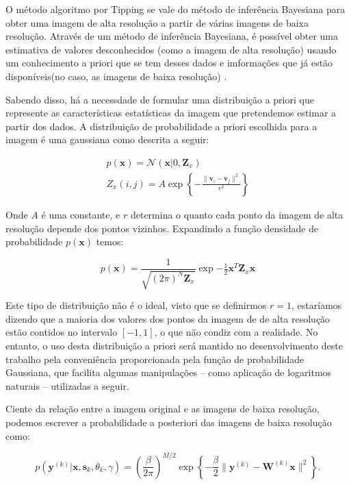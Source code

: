 \documentclass[12pt,openright,oneside,a4paper,english,brazil]{abntex2}
\begin{document}
O método algoritmo por Tipping se vale do método de inferência Bayesiana para obter uma imagem de alta resolução a partir de várias imagens de baixa resolução.
Através de um método de inferência Bayesiana, é possível obter uma estimativa de valores desconhecidos (como a imagem de alta resolução) usando um conhecimento a priori que se tem desses dados e imformações que já estão disponíveis(no caso, as imagens de baixa resolução) \cite{therrien2011probability}.

Sabendo disso, há a necessdade de formular uma distribuição a priori que represente as características estatísticas da imagem que pretendemos estimar a partir dos dados.
A distribuição de probabilidade a priori escolhida para a imagem é uma gaussiana como descrita a seguir:

\begin{gather}
	p(\mathbf{x}) = \mathcal{N}(\mathbf{x} | 0, \mathbf{Z}_x) \\ 
	Z_x(i,j) = A \exp \left\{ - \frac{\|\mathbf{v}_i - \mathbf{v}_j \|^2}{r^2} \right\}
\end{gather}

Onde $A$ é uma constante, e $r$ determina o quanto cada ponto da imagem de alta resolução depende dos pontos vizinhos.
Expandindo a função densidade de probabilidade $p(\mathbf{x})$ temos:

\begin{equation}
	p(\mathbf{x}) = \frac{1}{\sqrt{(2\pi)^N \mathbf{Z}_x}}\exp{-\tfrac{1}{2} \mathbf{x}^T \mathbf{Z}_x \mathbf{x}}
\end{equation}

Este tipo de distribuição não é o ideal, visto que se definirmos $r=1$, estaríamos dizendo que a maioria dos valores dos pontos da imagem de de alta resolução estão contidos no intervalo $[-1,1]$, o que não condiz com a realidade.
No entanto, o uso desta distribuição a priori será mantido no desenvolvimento deste trabalho pela conveniência proporcionada pela função de probabilidade Gaussiana, que facilita algumas manipulações -- como aplicação de logaritmos naturais --  utilizadas a seguir.

Ciente da relação entre a imagem original e as imagens de baixa resolução, podemos escrever a probabilidade a posteriori das imagens de baixa resolução como:

\begin{equation}
	\label{eq:posterior0}
	p(\mathbf{y}^{(k)} | \mathbf{x}, \mathbf{s}_k, \theta_k, \gamma) = 
	\left(\frac{\beta}{2\pi}\right)^{M/2}
	\exp \left\{ -\frac{\beta}{2} \| \mathbf{y}^{(k)} - \mathbf{W}^{(k)} \mathbf{x} \|^2 \right\}.
\end{equation}
\end{document}
